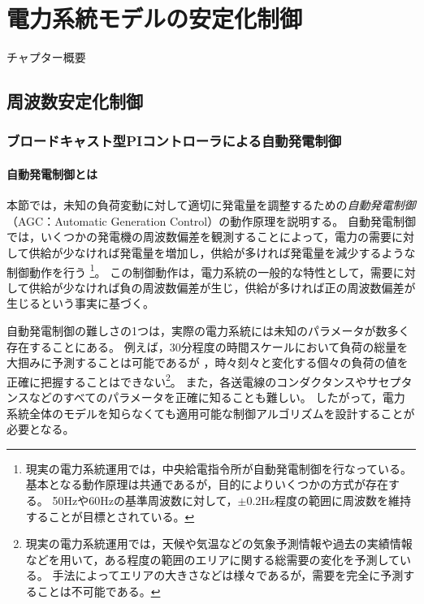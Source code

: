 \documentclass[tombow,dvipdfmx]{corona-a5-1.1}
\begin{document}
\chapter{電力系統モデルの安定化制御}

チャプター概要

\section{周波数安定化制御}
\subsection{ブロードキャスト型PIコントローラによる自動発電制御}

\subsubsection{自動発電制御とは}

本節では，未知の負荷変動に対して適切に発電量を調整するための\emph{自動発電制御}（AGC：Automatic Generation Control）の動作原理を説明する。
自動発電制御では，いくつかの発電機の周波数偏差を観測することによって，電力の需要に対して供給が少なければ発電量を増加し，供給が多ければ発電量を減少するような制御動作を行う
\footnote{
現実の電力系統運用では，中央給電指令所が自動発電制御を行なっている。
基本となる動作原理は共通であるが，目的によりいくつかの方式が存在する。
50Hzや60Hzの基準周波数に対して，$\pm$0.2Hz程度の範囲に周波数を維持することが目標とされている。
}。
この制御動作は，電力系統の一般的な特性として，需要に対して供給が少なければ負の周波数偏差が生じ，供給が多ければ正の周波数偏差が生じるという事実に基づく。

自動発電制御の難しさの1つは，実際の電力系統には未知のパラメータが数多く存在することにある。
例えば，30分程度の時間スケールにおいて負荷の総量を大掴みに予測することは可能であるが
，時々刻々と変化する個々の負荷の値を正確に把握することはできない\footnote{
現実の電力系統運用では，天候や気温などの気象予測情報や過去の実績情報などを用いて，ある程度の範囲のエリアに関する総需要の変化を予測している。
手法によってエリアの大きさなどは様々であるが，需要を完全に予測することは不可能である。
}。
また，各送電線のコンダクタンスやサセプタンスなどのすべてのパラメータを正確に知ることも難しい。
したがって，電力系統全体のモデルを知らなくても適用可能な制御アルゴリズムを設計することが必要となる。
\end{document}
